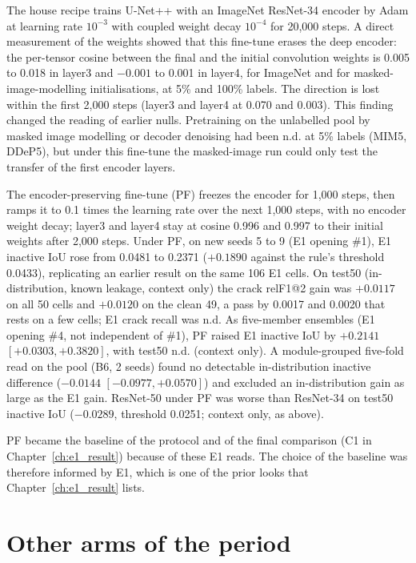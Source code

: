 The house recipe trains U-Net++ \citep{zhou2018unetpp} with an ImageNet ResNet-34 encoder by Adam at learning rate $10^{-3}$ with
coupled weight decay $10^{-4}$ for 20,000 steps. A direct measurement of the weights showed that this fine-tune erases the deep
encoder: the per-tensor cosine between the final and the initial convolution weights is 0.005 to 0.018 in layer3 and $-0.001$ to
0.001 in layer4, for ImageNet and for masked-image-modelling initialisations, at 5\% and 100\% labels. The direction is lost within
the first 2,000 steps (layer3 and layer4 at 0.070 and 0.003). This finding changed the reading of earlier nulls. Pretraining on the
unlabelled pool by masked image modelling or decoder denoising \citep{brempong2022ddep} had been n.d. at 5\% labels (MIM5, DDeP5),
but under this fine-tune the masked-image run could only test the transfer of the first encoder layers.

The encoder-preserving fine-tune (PF) freezes the encoder for 1,000 steps, then ramps it to 0.1 times the learning
rate over the next 1,000 steps, with no encoder weight decay; layer3 and layer4 stay at cosine 0.996 and 0.997 to their initial weights after 2,000 steps. Under PF,
on new seeds 5 to 9 (E1 opening \#1), E1 inactive IoU rose from 0.0481 to 0.2371 ($+0.1890$ against the rule's threshold 0.0433),
replicating an earlier result on the same 106 E1 cells. On test50 (in-distribution, known leakage, context only) the crack relF1@2
gain was $+0.0117$ on all 50 cells and $+0.0120$ on the clean 49, a pass by 0.0017 and 0.0020 that rests on a few cells; E1 crack
recall was n.d. As five-member ensembles (E1 opening \#4, not independent of \#1), PF raised E1 inactive IoU by $+0.2141$
$[+0.0303, +0.3820]$, with test50 n.d. (context only). A module-grouped five-fold read on the pool (B6, 2 seeds) found no detectable in-distribution inactive difference
($-0.0144$ $[-0.0977, +0.0570]$) and excluded an in-distribution gain as large as the E1 gain. ResNet-50 under PF was worse than
ResNet-34 on test50 inactive IoU ($-0.0289$, threshold 0.0251; context only, as above).

PF became the baseline of the protocol and of the final comparison (C1 in Chapter~\ref{ch:e1_result}) because of these E1 reads.
The choice of the baseline was therefore informed by E1, which is one of the prior looks that Chapter~\ref{ch:e1_result} lists.

\section{Other arms of the period}\label{sec:legacy-arms}

